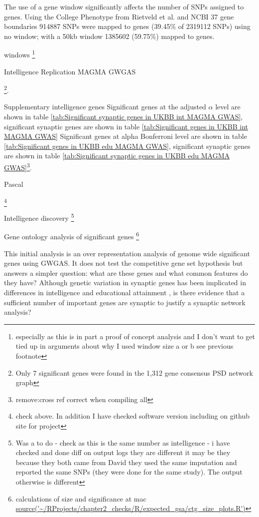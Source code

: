 The use of a gene window significantly affects the number of SNPs assigned to genes.  Using the College Phenotype from Rietveld et al. \cite{rietveld2013gwas} and NCBI 37 gene boundaries 914887 SNPs were mapped to genes (39.45\% of 2319112 SNPs) using no window; with a 50kb window 1385602 (59.75\%) mapped to genes.

windows
\footnote{especially as this is in part a proof of concept analysis and I don't want to get tied up in arguments about why I used window size a or b see previous footnote}


Intelligence Replication MAGMA GWGAS

\footnote{Only 7 significant genes were found in the 1,312 gene consensus PSD network graph\cite{mclean2016improved}}.


Supplementary intelligence genes
Significant genes at the adjusted $\alpha$ level are shown in table \ref{tab:Significant synaptic genes in UKBB int  MAGMA GWAS}, significant synaptic genes are shown in table \ref{tab:Significant genes in UKBB int MAGMA GWAS}
Significant genes at alpha Bonferroni level are shown in table \ref{tab:Significant genes in UKBB edu MAGMA GWAS}, significant synaptic genes are shown in table \ref{tab:Significant synaptic genes in UKBB edu  MAGMA GWAS}\footnote{remove:cross ref correct when compiling all}.


Pascal

\footnote{check above. In addition I have checked software version including on github site for project} 


Intelligence discovery
\footnote{ Was a to do - check as this is the same number as intelligence - i have checked and done diff on output logs they are different it may be they because they both came from David they used the same imputation and reported the same SNPs (they were done for the same study). The output otherwise is different} 

Gene ontology analysis of significant genes
\footnote{calculations of size and significance at mac \url{ source('~/RProjects/chapter2_checks/R/expected_gsa/ctg_size_plots.R')}}

 This initial analysis  is an over representation analysis of genome wide significant genes using GWGAS. It does not test the competitive gene set hypothesis but answers a simpler question: what are these genes and what common features do they have? Although genetic variation in synaptic genes has been implicated in differences in intelligence and educational attainment \cite{hill2014human}\cite{okbay2016genome}, is there evidence that a sufficient number of important genes are synaptic to justify a synaptic network analysis?
 

